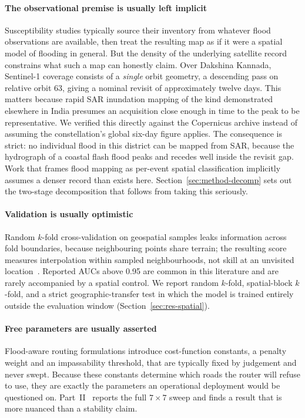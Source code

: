 \documentclass[journal]{IEEEtran}
\begin{document}
\paragraph{The observational premise is usually left implicit}
Susceptibility studies typically source their inventory from whatever flood
observations are available, then treat the resulting map as if it were a spatial
model of flooding in general. But the density of the underlying satellite record
constrains what such a map can honestly claim. Over Dakshina Kannada, Sentinel-1
\citep{torres2012} coverage consists of a \emph{single} orbit geometry, a
descending pass on relative orbit 63, giving a nominal revisit of approximately
twelve days. This matters because rapid SAR inundation mapping of the kind
demonstrated elsewhere in India \citep{arora2023} presumes an acquisition close
enough in time to the peak to be representative. We
verified this directly against the Copernicus archive instead of assuming the
constellation's global six-day figure applies. The consequence is strict: no
individual flood in this district can be mapped from SAR, because the hydrograph
of a coastal flash flood peaks and recedes well inside the revisit gap. Work that
frames flood mapping as per-event spatial classification implicitly assumes a
denser record than exists here. Section~\ref{sec:method-decomp} sets out the
two-stage decomposition that follows from taking this seriously.

\paragraph{Validation is usually optimistic}
Random $k$-fold cross-validation on geospatial samples leaks information across
fold boundaries, because neighbouring points share terrain; the resulting score
measures interpolation within sampled neighbourhoods, not skill at an
unvisited location~\citep{roberts2017,ploton2020,meyer2021}. Reported AUCs above
0.95 are common in this literature and are rarely accompanied by a spatial
control. We report random $k$-fold, spatial-block $k$-fold, and a strict
geographic-transfer test in which the model is trained entirely outside the
evaluation window (Section~\ref{sec:res-spatial}).

\paragraph{Free parameters are usually asserted}
Flood-aware routing formulations introduce cost-function constants, a penalty
weight and an impassability threshold, that are typically fixed by judgement and
never swept. Because these constants determine which roads the router will refuse
to use, they are exactly the parameters an operational deployment would be
questioned on. Part~II~\cite{partii} reports the full
$7\times7$ sweep and finds a result that is more nuanced than a stability claim.
\end{document}
